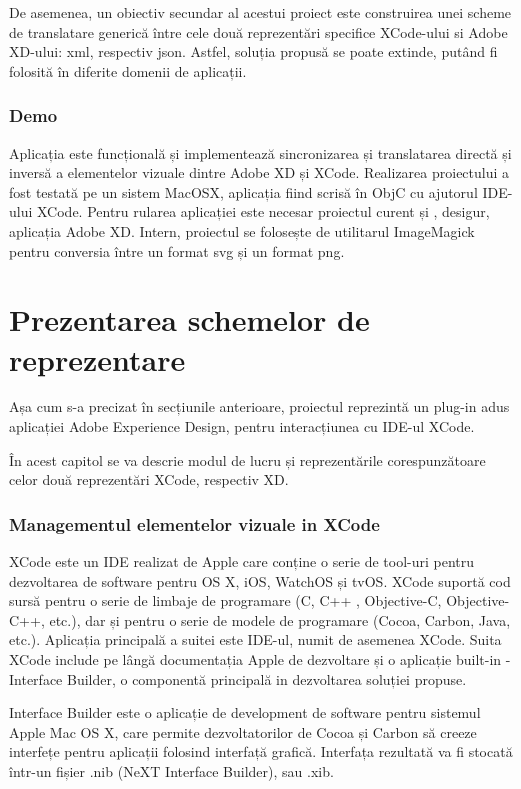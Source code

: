 De asemenea, un obiectiv secundar al acestui proiect este construirea unei scheme de translatare generică între cele două reprezentări specifice XCode-ului si Adobe XD-ului: xml, respectiv json.
Astfel, soluția propusă se poate extinde, putând fi folosită în diferite domenii de aplicații.


\subsection{Demo}

Aplicația este funcțională și implementează sincronizarea și translatarea directă și inversă a elementelor vizuale dintre Adobe XD și XCode. 
Realizarea proiectului a fost testată pe un sistem MacOSX, aplicația fiind scrisă în ObjC cu ajutorul IDE-ului XCode. Pentru rularea aplicației este necesar proiectul curent  și , desigur, aplicația Adobe XD.
Intern, proiectul se folosește de utilitarul ImageMagick pentru conversia între un format svg și un format png.


\chapter{Prezentarea schemelor de reprezentare}

Așa cum s-a precizat în secțiunile anterioare, proiectul reprezintă un plug-in adus aplicației Adobe Experience Design, pentru interacțiunea cu IDE-ul XCode. 

În acest capitol se va descrie modul de lucru și reprezentările corespunzătoare celor două reprezentări XCode, respectiv XD.

\subsection{Managementul elementelor vizuale in XCode}

XCode este un IDE realizat de Apple care conține o serie de tool-uri pentru dezvoltarea de software pentru OS X, iOS, WatchOS și tvOS. XCode suportă cod sursă pentru o serie de limbaje de programare (C, C++ , Objective-C, Objective-C++, etc.), dar și pentru o serie de modele de programare (Cocoa, Carbon, Java, etc.). Aplicația principală a suitei este IDE-ul, numit de asemenea XCode. Suita XCode include pe lângă documentația Apple de dezvoltare și o aplicație built-in - Interface Builder, o componentă principală in dezvoltarea soluției propuse.

Interface Builder este o aplicație de development de software pentru sistemul Apple Mac OS X, care permite dezvoltatorilor de Cocoa și Carbon să creeze interfețe pentru aplicații folosind interfață grafică. Interfața rezultată va fi stocată într-un fișier .nib (NeXT Interface Builder), sau .xib.

